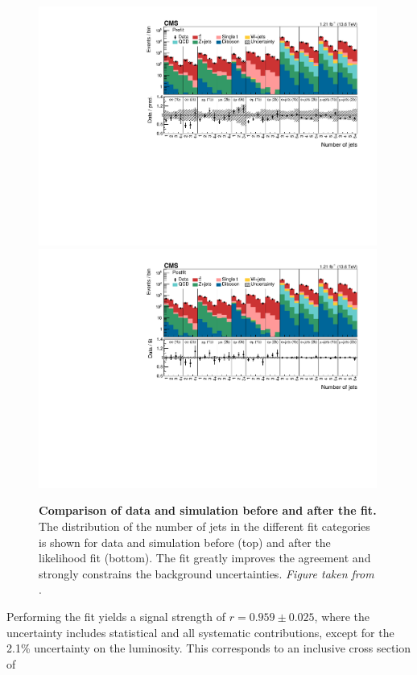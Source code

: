 \begin{figure}[!ht]
\centering
\includegraphics[width=0.99\textwidth]{figures/ttxs/prefithist.pdf}
\includegraphics[width=0.99\textwidth]{figures/ttxs/postfithist.pdf}

\caption{
   \textbf{Comparison of data and simulation before and after the fit.} The distribution of the number of jets in the different fit categories is shown for data and simulation before (top) and after the likelihood fit (bottom). The fit greatly improves the agreement and strongly constrains the background uncertainties. \textit{Figure taken from }.
}
\label{fig:ttxs:prepostfit}
\end{figure}

Performing the fit yields a \ttbar signal strength of $r = 0.959 \pm 0.025$, where the uncertainty includes statistical and all systematic contributions, except for the 2.1\% uncertainty on the luminosity. This corresponds to an inclusive \ttbar cross section of

